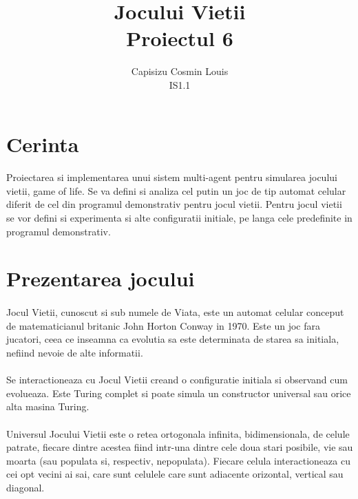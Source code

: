\documentclass[11pt ,A4]{article}
\title{Jocului Vietii\\Proiectul 6}
\author{Capisizu Cosmin Louis\\IS1.1} %
\begin{document}
    \maketitle %
    \pagebreak

    \section{Cerinta} %
        \paragraph{}
            Proiectarea si implementarea unui sistem multi-agent pentru simularea jocului vietii, game of life. Se va defini si analiza cel putin un joc de tip automat celular diferit de cel din programul demonstrativ pentru jocul vietii. Pentru jocul vietii se vor defini si experimenta si alte configuratii initiale, pe langa cele predefinite in programul demonstrativ.

    \section{Prezentarea jocului}

        \paragraph{}Jocul Vietii, cunoscut si sub numele de Viata, este un automat celular conceput de matematicianul britanic John Horton Conway in 1970. Este un joc fara jucatori, ceea ce inseamna ca evolutia sa este determinata de starea sa initiala, nefiind nevoie de alte informatii.

        \paragraph{} Se interactioneaza cu Jocul Vietii creand o configuratie initiala si observand cum evolueaza. Este Turing complet si poate simula un constructor universal sau orice alta masina Turing.

        \paragraph{} Universul Jocului Vietii este o retea ortogonala infinita, bidimensionala, de celule patrate, fiecare dintre acestea fiind intr-una dintre cele doua stari posibile, vie sau moarta (sau populata si, respectiv, nepopulata). Fiecare celula interactioneaza cu cei opt vecini ai sai, care sunt celulele care sunt adiacente orizontal, vertical sau diagonal.
\end{document}
